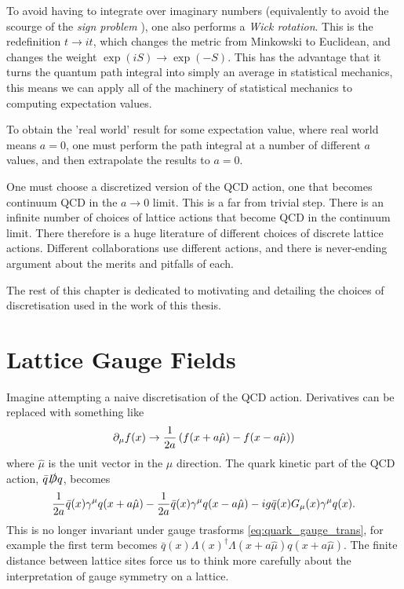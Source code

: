 To avoid having to integrate over imaginary numbers (equivalently to avoid the scourge of the {\it{sign problem}} \cite{deForcrand:2010ys}), one also performs a {\it{Wick rotation}}. This is the redefinition $t\to it$, which changes the metric from Minkowski to Euclidean, and changes the weight $\exp(iS) \to \exp(-S)$. This has the advantage that it turns the quantum path integral into simply an average in statistical mechanics, this means we can apply all of the machinery of statistical mechanics to computing expectation values.

To obtain the 'real world' result for some expectation value, where real world means $a=0$, one must perform the path integral at a number of different $a$ values, and then extrapolate the results to $a=0$.

One must choose a discretized version of the QCD action, one that becomes continuum QCD in the $a\to 0$ limit. This is a far from trivial step. There is an infinite number of choices of lattice actions that become QCD in the continuum limit. There therefore is a huge literature of different choices of discrete lattice actions. Different collaborations use different actions, and there is never-ending argument about the merits and pitfalls of each.

The rest of this chapter is dedicated to motivating and detailing the choices of discretisation used in the work of this thesis.

\section{Lattice Gauge Fields}
\label{sec:gaugefields}

Imagine attempting a naive discretisation of the QCD action. Derivatives can be replaced with something like
\begin{align}
  \partial_{\mu}f(x) \to {1\over 2a} \left( f(x+a\hat{\mu}) - f(x-a\hat{\mu}) \right)
\end{align}
where $\hat{\mu}$ is the unit vector in the $\mu$ direction. The quark kinetic part of the QCD action, $\bar{q}\slashed{D}q$, becomes
\begin{align}
  {1\over 2a} \bar{q}(x)\gamma^{\mu}q(x+a\hat{\mu}) - {1\over 2a} \bar{q}(x)\gamma^{\mu}q(x-a\hat{\mu}) - ig\bar{q}(x)G_{\mu}(x)\gamma^{\mu} q(x).
\end{align}
This is no longer invariant under gauge trasforms \eqref{eq:quark_gauge_trans}, for example the first term becomes $\bar{q}(x)\Lambda(x)^{\dagger} \Lambda(x+a\hat{\mu}) q(x+a\hat{\mu})$. The finite distance between lattice sites force us to think more carefully about the interpretation of gauge symmetry on a lattice.

